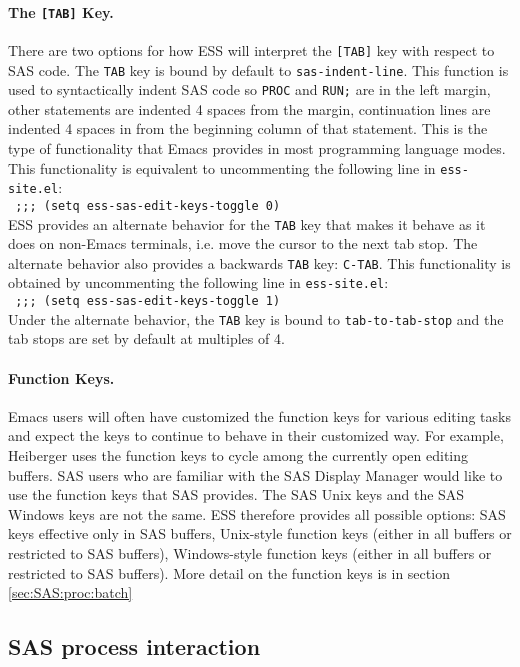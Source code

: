 \documentclass{article}
\newcommand{\stexttt}[1]{{\small\texttt{#1}}}
\newcommand{\elcode}[1]{\\{\stexttt{\hspace*{2em} #1}}\\}
\begin{document}
\paragraph{The \texttt{[TAB]} Key.}
\label{sec:SAS:tab}

There are two options for how ESS will interpret the \stexttt{[TAB]} key
with respect to SAS code.  The \stexttt{TAB} key is bound by default to
\stexttt{sas-indent-line}.  This function is used to syntactically indent SAS
code so \stexttt{PROC} and \stexttt{RUN;} are in the left margin, other
statements are indented 4 spaces from the margin, continuation lines
are indented 4 spaces in from the beginning column of that statement.
This is the type of functionality that Emacs provides in most
programming language modes.  This functionality is equivalent to
uncommenting the following line in \stexttt{ess-site.el}:
\elcode{;;; (setq ess-sas-edit-keys-toggle 0)}
ESS provides an alternate behavior for the \stexttt{TAB} key that makes it
behave as it does on non-Emacs terminals, i.e. move the cursor to the
next tab stop.  The alternate behavior also provides a backwards \stexttt{TAB}
key: \stexttt{C-TAB}.  This functionality is obtained by
uncommenting the following line in \stexttt{ess-site.el}:
\elcode{;;; (setq ess-sas-edit-keys-toggle 1)}
Under the alternate behavior, the \stexttt{TAB} key is bound to
\stexttt{tab-to-tab-stop} and the tab stops are set by default at multiples
of 4.

\paragraph{Function Keys.}
Emacs users will often have customized the function keys for various
editing tasks and expect the keys to continue to behave in their
customized way.  For example, Heiberger uses the function keys to
cycle among the currently open editing buffers.  SAS users who are
familiar with the SAS Display Manager would like to use the function
keys that SAS provides.  The SAS Unix keys and the SAS Windows keys
are not the same.  ESS therefore provides all possible options: SAS
keys effective only in SAS buffers, Unix-style function keys (either
in all buffers or restricted to SAS buffers), Windows-style function
keys (either in all buffers or restricted to SAS buffers).
More detail on the function keys is in section \ref{sec:SAS:proc:batch}


\subsection{SAS process interaction}
\label{sec:SAS:proc}
\end{document}
